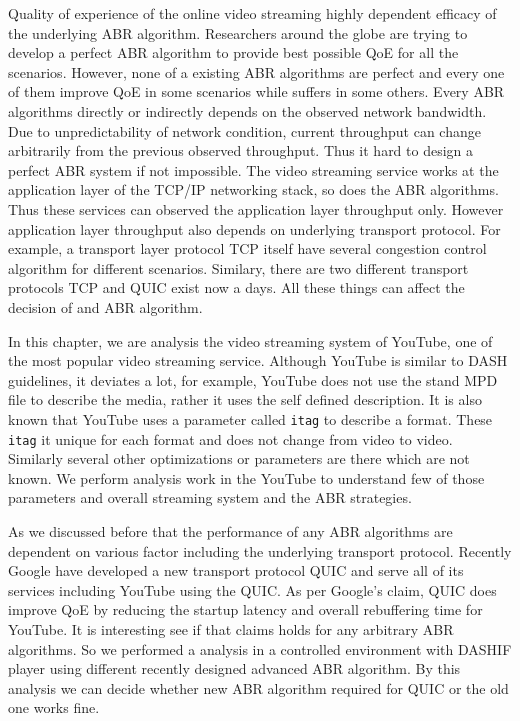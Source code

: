 
Quality of experience of the online video streaming highly dependent efficacy of the underlying ABR algorithm. Researchers around the globe are trying to develop a perfect ABR algorithm to provide best possible QoE for all the scenarios. However, none of a existing ABR algorithms are perfect and every one of them improve QoE in some scenarios while suffers in some others. Every ABR algorithms directly or indirectly depends on the observed network bandwidth. Due to unpredictability of network condition, current throughput can change arbitrarily from the previous observed throughput. Thus it hard to design a perfect ABR system if not impossible. The video streaming service works at the application layer of the TCP/IP networking stack, so does the ABR algorithms. Thus these services can observed the application layer throughput only. However application layer throughput also depends on underlying transport protocol. For example, a transport layer protocol TCP itself have several congestion control algorithm for different scenarios. Similary, there are two different transport protocols TCP and QUIC exist now a days. All these things can affect the decision of and ABR algorithm.

In this chapter, we are analysis the video streaming system of YouTube, one of the most popular video streaming service. Although YouTube is similar to DASH guidelines, it deviates a lot, for example, YouTube does not use the stand MPD file to describe the media, rather it uses the self defined description. It is also known that YouTube uses a parameter called {\tt itag} to describe a format. These {\tt itag} it unique for each format and does not change from video to video. Similarly several other optimizations or parameters are there which are not known. We perform analysis work in the YouTube to understand few of those parameters and overall streaming system and the ABR strategies.

As we discussed before that the performance of any ABR algorithms are dependent on various factor including the underlying transport protocol. Recently Google have developed a new transport protocol QUIC and serve all of its services including YouTube using the QUIC. As per Google's claim, QUIC does improve QoE by reducing the startup latency and overall rebuffering time for YouTube. It is interesting see if that claims holds for any arbitrary ABR algorithms. So we performed a analysis in a controlled environment with DASHIF player using different recently designed advanced ABR algorithm. By this analysis we can decide whether new ABR algorithm required for QUIC or the old one works fine.


